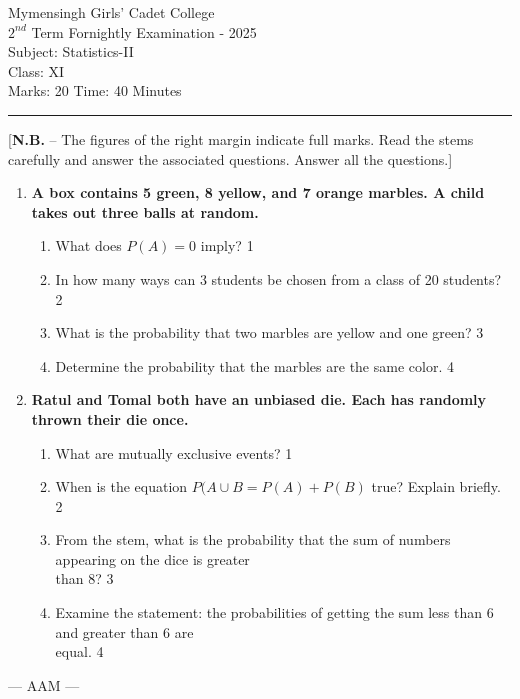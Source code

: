 \documentclass[12pt]{article}
\begin{document}
\begin{center}
Mymensingh Girls' Cadet College \\
$2^{nd}$ Term Fornightly Examination - 2025 \\
Subject: Statistics-II \\
Class: XI \\
Marks: 20 \hfill Time: 40 Minutes
\end{center}



\hrule

\begin{center}
[\textbf{N.B.} – The figures of the right margin indicate full marks. Read 
the stems carefully and answer the associated questions. Answer all the questions.]\\
\end{center}


  \begin{enumerate}

   \item
	  \textbf{A box contains 5 green, 8 yellow, and 7 orange marbles. A child takes out three balls at random.} 
  
  \begin{enumerate}
  \item What does $P(A) = 0$ imply? \hfill 1
  \item
In how many ways can 3 students be chosen from a class of 20 students? \hfill 2
    \item  
	What is the probability that two marbles are yellow and one green? \hfill 3
    \item
	Determine the probability that the marbles are the same color. \hfill 4
  \end{enumerate}
  
         \item
	  \textbf{Ratul and Tomal both have an unbiased die. Each has randomly thrown their die once.} 
  
  \begin{enumerate}
    \item
	What are mutually exclusive events? \hfill 1
	\item When is the equation $P(A \cup B = P(A) + P(B)$ true? Explain briefly. \hfill 2
    \item  
	From the stem, what is the probability that the sum of numbers appearing
	 on the dice is greater\\ than 8? \hfill 3
    \item
	Examine the statement: the probabilities of getting the sum less than 6 and greater 
	than 6 are \\ equal. \hfill 4
  \end{enumerate}

\end{enumerate}  
  
\begin{center}
--- AAM ---
\end{center}
\end{document}
